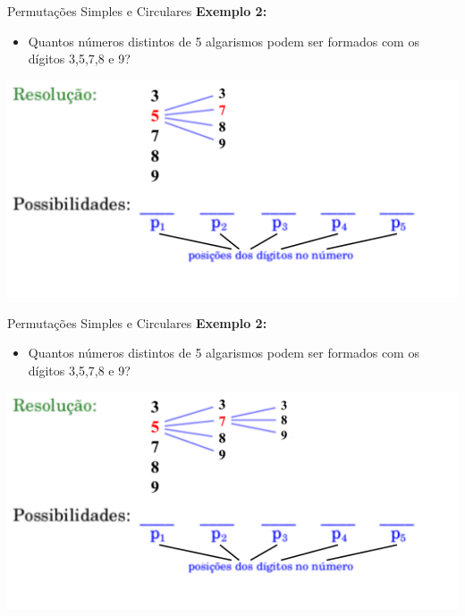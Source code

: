 \documentclass[aspectratio=169]{beamer}
\begin{document}
\begin{frame}{Permutações Simples e Circulares}
    \textbf{Exemplo 2:}

    \vspace{3mm}

    \begin{itemize}
        \item[] Quantos números distintos de 5 algarismos podem ser formados com os dígitos 3,5,7,8 e 9?
    \end{itemize}

    \begin{center}
        \includegraphics[width=0.75\linewidth]{figs/Exemplo2_4.png}
    \end{center}
\end{frame}

\begin{frame}{Permutações Simples e Circulares}
    \textbf{Exemplo 2:}

    \vspace{3mm}

    \begin{itemize}
        \item[] Quantos números distintos de 5 algarismos podem ser formados com os dígitos 3,5,7,8 e 9?
    \end{itemize}

    \begin{center}
        \includegraphics[width=0.75\linewidth]{figs/Exemplo2_5.png}
    \end{center}
\end{frame}
\end{document}
